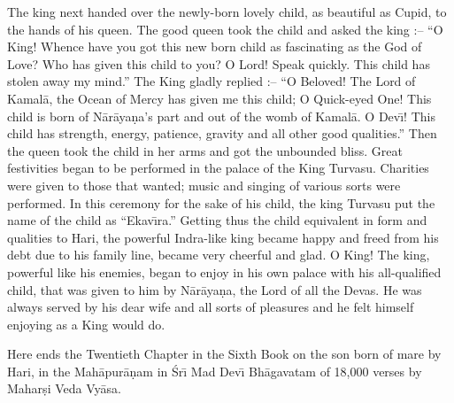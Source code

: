 The king next handed over the newly-born lovely child, as beautiful as Cupid, to the hands of his queen. The good queen took the child and asked the king :-- ``O King! Whence have you got this new born child as fascinating as the God of Love? Who has given this child to you? O Lord! Speak quickly. This child has stolen away my mind.'' The King gladly replied :-- ``O Beloved! The Lord of Kamal\=a, the Ocean of Mercy has given me this child; O Quick-eyed One! This child is born of N\=ar\=aya\d{n}a's part and out of the womb of Kamal\=a. O Dev\={\i}! This child has strength, energy, patience, gravity and all other good qualities.'' Then the queen took the child in her arms and got the unbounded bliss. Great festivities began to be performed in the palace of the King Turvasu. Charities were given to those that wanted; music and singing of various sorts were performed. In this ceremony for the sake of his child, the king Turvasu put the name of the child as ``Ekav\={\i}ra.'' Getting thus the child equivalent in form and qualities to Hari, the powerful Indra-like king became happy and freed from his debt due to his family line, became very cheerful and glad. O King! The king, powerful like his enemies, began to enjoy in his own palace with his all-qualified child, that was given to him by N\=ar\=aya\d{n}a, the Lord of all the Devas. He was always served by his dear wife and all sorts of pleasures and he felt himself enjoying as a King would do.

Here ends the Twentieth Chapter in the Sixth Book on the son born of mare by Hari, in the Mah\=apur\=a\d{n}am in \'Sr\={\i} Mad Dev\={\i} Bh\=agavatam of 18,000 verses by Mahar\d{s}i Veda Vy\=asa.



